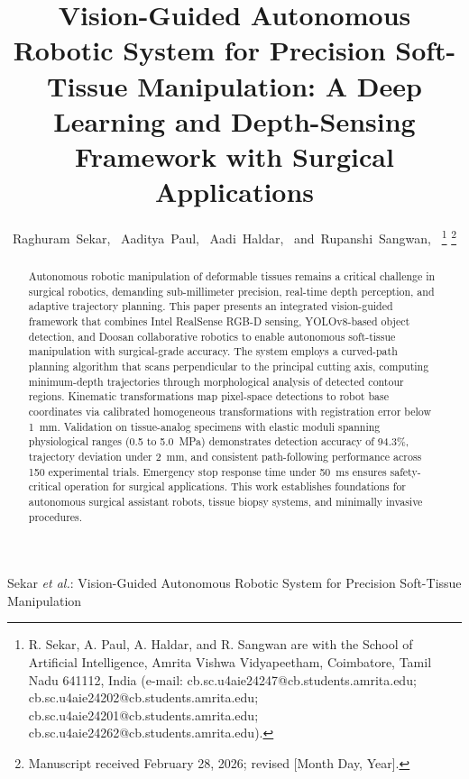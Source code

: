 \documentclass[journal]{IEEEtran}
\begin{document}
\title{Vision-Guided Autonomous Robotic System for Precision Soft-Tissue Manipulation: A Deep Learning and Depth-Sensing Framework with Surgical Applications}

\author{Raghuram~Sekar,~
        Aaditya~Paul,~
        Aadi~Haldar,~
        and~Rupanshi~Sangwan,~
\thanks{R. Sekar, A. Paul, A. Haldar, and R. Sangwan are with the School of Artificial Intelligence, Amrita Vishwa Vidyapeetham, Coimbatore, Tamil Nadu 641112, India (e-mail: cb.sc.u4aie24247@cb.students.amrita.edu; cb.sc.u4aie24202@cb.students.amrita.edu; cb.sc.u4aie24201@cb.students.amrita.edu; cb.sc.u4aie24262@cb.students.amrita.edu).}
\thanks{Manuscript received February 28, 2026; revised [Month Day, Year].}}

%
{Sekar \MakeLowercase{\textit{et al.}}: Vision-Guided Autonomous Robotic System for Precision Soft-Tissue Manipulation}

\maketitle

\begin{abstract}
Autonomous robotic manipulation of deformable tissues remains a critical challenge in surgical robotics, demanding sub-millimeter precision, real-time depth perception, and adaptive trajectory planning. This paper presents an integrated vision-guided framework that combines Intel RealSense RGB-D sensing, YOLOv8-based object detection, and Doosan collaborative robotics to enable autonomous soft-tissue manipulation with surgical-grade accuracy. The system employs a curved-path planning algorithm that scans perpendicular to the principal cutting axis, computing minimum-depth trajectories through morphological analysis of detected contour regions. Kinematic transformations map pixel-space detections to robot base coordinates via calibrated homogeneous transformations with registration error below 1~mm. Validation on tissue-analog specimens with elastic moduli spanning physiological ranges (0.5 to 5.0~MPa) demonstrates detection accuracy of 94.3\%, trajectory deviation under 2~mm, and consistent path-following performance across 150 experimental trials. Emergency stop response time under 50~ms ensures safety-critical operation for surgical applications. This work establishes foundations for autonomous surgical assistant robots, tissue biopsy systems, and minimally invasive procedures.
\end{abstract}
\end{document}
